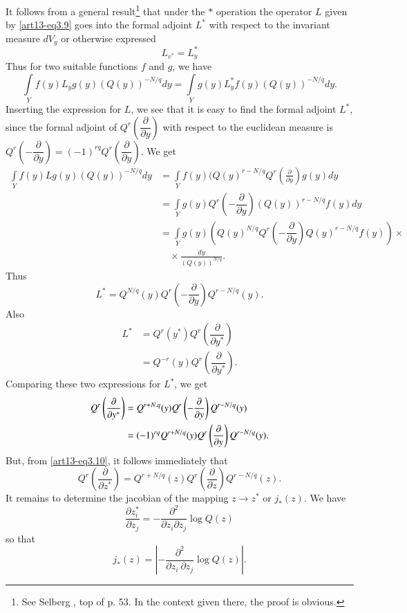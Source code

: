 It follows from a general result\footnote[11]{See Selberg \cite{art13-key3}, top of p. 53. In the context given there, the proof is obvious.} that under the $*$ operation the operator $L$ given by \eqref{art13-eq3.9} goes into the formal adjoint $L^{*}$ with respect to the invariant measure $dV_{y}$ or otherwise expressed
$$
L_{v^{*}}=L^{*}_{y}
$$
Thus for two suitable functions $f$ and $g$, we have
$$
\int\limits_{Y}f(y)L_{y}g(y)(Q(y))^{-N/q}dy=\int\limits_{Y}g(y)L^{*}_{y}f(y)(Q(y))^{-N/q}dy.
$$
Inserting the expression for $L$, we see that it is easy to find the formal adjoint $L^{*}$, since the formal adjoint of $Q^{r}\left(\dfrac{\partial}{\partial y}\right)$ with respect to the euclidean measure is $Q^{r}\left(-\dfrac{\partial}{\partial y}\right)=(-1)^{rq}Q^{r}\left(\dfrac{\partial}{\partial y}\right)$. We get
{\fontsize{10pt}{12pt}\selectfont
\begin{align*}
\int\limits_{Y}f(y)Lg(y)(Q(y))^{-N/q}dy &= \int\limits_{Y}f(y)(Q(y)^{r-N/q}Q^{r}\left(\frac{\partial}{\partial y}\right)g(y)dy\\[3pt]
&= \int\limits_{Y}g(y)Q^{r}\left(-\dfrac{\partial}{\partial y}\right)(Q(y))^{r-N/q}f(y)dy\\[3pt]
&= \int\limits_{Y}g(y)\left(Q(y)^{N/q}Q^{r}\left(-\dfrac{\partial}{\partial y}\right)Q(y)^{r-N/q}f(y)\right)\times{}\\
&\quad \times \frac{dy}{(Q(y))^{N/q}}.
\end{align*}}\relax
Thus
$$
L^{*}=Q^{N/q}(y)Q^{r}\left(-\dfrac{\partial}{\partial y}\right)Q^{r-N/q}(y).
$$
Also\pageoriginale
\begin{align*}
L^{*} &= Q^{r}(y^{*})Q^{r}\left(\dfrac{\partial}{\partial y^{*}}\right)\\
&= Q^{-r}(y)Q^{r}\left(\dfrac{\partial}{\partial y^{*}}\right).
\end{align*}
Comparing these two expressions for $L^{*}$, we get
\begin{align}
Q^{r}\left(\frac{\partial}{\partial y^{*}}\right) &= Q^{r+N.q}(y)Q^{r}\left(-\dfrac{\partial}{\partial y}\right)Q^{r-N/q}(y)\label{art13-eq3.10}\\
&= (-1)^{rq}Q^{r+N/q}(y)Q^{r}\left(\dfrac{\partial}{\partial y}\right)Q^{r-N/q}(y).\notag
\end{align}
But, from \eqref{art13-eq3.10}, it follows immediately that
\begin{equation}
Q^{r}\left(\dfrac{\partial}{\partial z^{*}}\right)=Q^{r+N/q}(z)Q^{r}\left(\dfrac{\partial}{\partial z}\right)Q^{r-N/q}(z).\label{art13-eq3.11}
\end{equation}
It remains to determine the jacobian of the mapping $z\to z^{*}$ or $j_{*}(z)$. We have
$$
\frac{\partial z^{*}_{i}}{\partial z_{j}}=-\frac{\partial^{2}}{\partial z_{i}\partial z_{j}}\log Q(z)
$$
so that
$$
j_{*}(z)=\left|-\frac{\partial^{2}}{\partial z_{i} \ \partial z_{j}}\log Q(z)\right|.
$$

